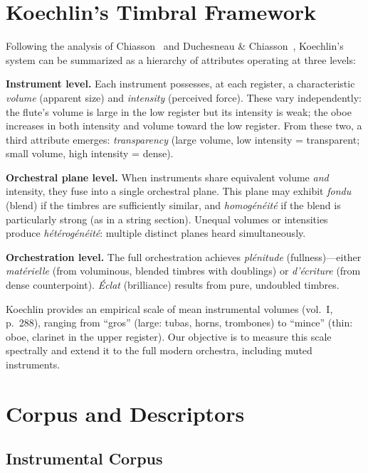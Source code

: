 \documentclass[journal]{IEEEtran}
\begin{document}
\section{Koechlin's Timbral Framework}
\label{sec:koechlin}

Following the analysis of Chiasson~\cite{Chiasson2008, ChiassonHumaniste} and Duchesneau \& Chiasson~\cite{DuchesneauChiasson}, Koechlin's system can be summarized as a hierarchy of attributes operating at three levels:

\textbf{Instrument level.} Each instrument possesses, at each register, a characteristic \textit{volume} (apparent size) and \textit{intensity} (perceived force). These vary independently: the flute's volume is large in the low register but its intensity is weak; the oboe increases in both intensity and volume toward the low register. From these two, a third attribute emerges: \textit{transparency} (large volume, low intensity = transparent; small volume, high intensity = dense).

\textbf{Orchestral plane level.} When instruments share equivalent volume \emph{and} intensity, they fuse into a single orchestral plane. This plane may exhibit \textit{fondu} (blend) if the timbres are sufficiently similar, and \textit{homogénéité} if the blend is particularly strong (as in a string section). Unequal volumes or intensities produce \textit{hétérogénéité}: multiple distinct planes heard simultaneously.

\textbf{Orchestration level.} The full orchestration achieves \textit{plénitude} (fullness)---either \textit{matérielle} (from voluminous, blended timbres with doublings) or \textit{d'écriture} (from dense counterpoint). \textit{Éclat} (brilliance) results from pure, undoubled timbres.

Koechlin provides an empirical scale of mean instrumental volumes (vol.~I, p.~288), ranging from ``gros'' (large: tubas, horns, trombones) to ``mince'' (thin: oboe, clarinet in the upper register). Our objective is to measure this scale spectrally and extend it to the full modern orchestra, including muted instruments.

\section{Corpus and Descriptors}
\label{sec:corpus}

\subsection{Instrumental Corpus}
\end{document}
